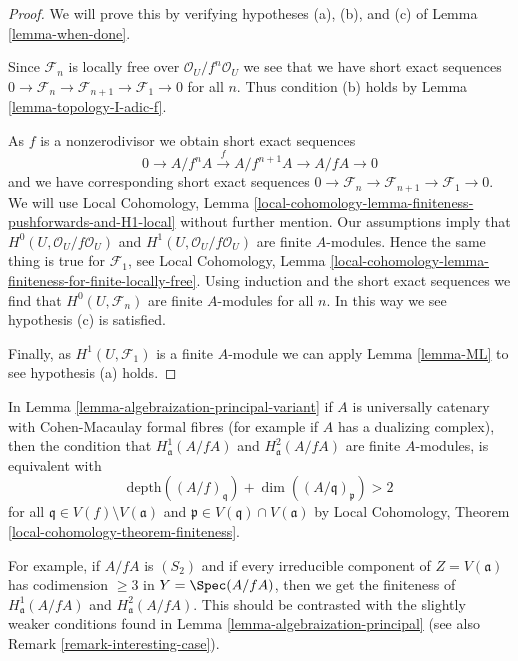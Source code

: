 \begin{proof}
We will prove this by verifying hypotheses (a), (b), and (c) of
Lemma \ref{lemma-when-done}.

\medskip\noindent
Since $\mathcal{F}_n$ is locally free over $\mathcal{O}_U/f^n\mathcal{O}_U$
we see that we have short exact sequences
$0 \to \mathcal{F}_n \to \mathcal{F}_{n + 1} \to \mathcal{F}_1 \to 0$
for all $n$. Thus condition (b) holds by Lemma \ref{lemma-topology-I-adic-f}.

\medskip\noindent
As $f$ is a nonzerodivisor we obtain short exact sequences
$$
0 \to A/f^nA \xrightarrow{f} A/f^{n + 1}A \to A/fA \to 0
$$
and we have corresponding short exact sequences
$0 \to \mathcal{F}_n \to \mathcal{F}_{n + 1} \to \mathcal{F}_1 \to 0$.
We will use
Local Cohomology, Lemma
\ref{local-cohomology-lemma-finiteness-pushforwards-and-H1-local}
without further mention. Our assumptions imply that
$H^0(U, \mathcal{O}_U/f\mathcal{O}_U)$ and
$H^1(U, \mathcal{O}_U/f\mathcal{O}_U)$
are finite $A$-modules. Hence the same thing is true for $\mathcal{F}_1$, see
Local Cohomology, Lemma
\ref{local-cohomology-lemma-finiteness-for-finite-locally-free}.
Using induction and the short exact sequences we find that
$H^0(U, \mathcal{F}_n)$ are finite $A$-modules for all $n$.
In this way we see hypothesis (c) is satisfied.

\medskip\noindent
Finally, as $H^1(U, \mathcal{F}_1)$ is a finite $A$-module
we can apply Lemma \ref{lemma-ML} to see hypothesis (a) holds.
\end{proof}

\begin{remark}
\label{remark-interesting-case-variant}
In Lemma \ref{lemma-algebraization-principal-variant}
if $A$ is universally catenary with Cohen-Macaulay
formal fibres (for example if $A$ has a dualizing complex), then
the condition that
$H^1_\mathfrak a(A/fA)$ and $H^2_\mathfrak a(A/fA)$
are finite $A$-modules, is equivalent with
$$
\text{depth}((A/f)_\mathfrak q) + \dim((A/\mathfrak q)_\mathfrak p) > 2
$$
for all $\mathfrak q \in V(f) \setminus V(\mathfrak a)$
and $\mathfrak p \in V(\mathfrak q) \cap V(\mathfrak a)$
by Local Cohomology, Theorem \ref{local-cohomology-theorem-finiteness}.

\medskip\noindent
For example, if $A/fA$ is $(S_2)$ and if every irreducible
component of $Z = V(\mathfrak a)$ has codimension $\geq 3$
in $Y = \Spec(A/fA)$, then we get the finiteness of
$H^1_\mathfrak a(A/fA)$ and $H^2_\mathfrak a(A/fA)$.
This should be contrasted with the slightly weaker conditions
found in Lemma \ref{lemma-algebraization-principal}
(see also Remark \ref{remark-interesting-case}).
\end{remark}







